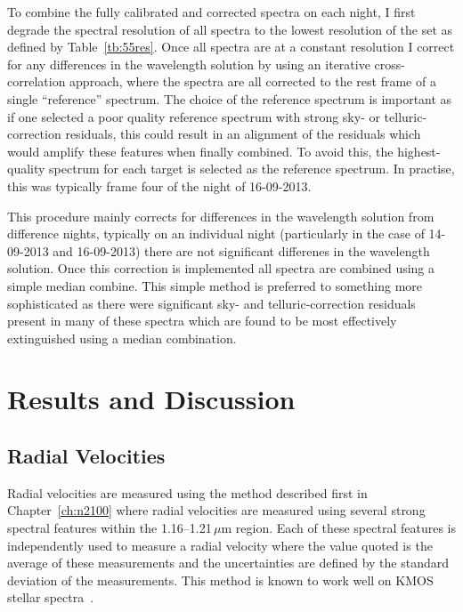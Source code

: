 To combine the fully calibrated and corrected spectra on each night, I first degrade the spectral resolution of all spectra to the lowest resolution of the set as defined by Table~\ref{tb:55res}.
Once all spectra are at a constant resolution I correct for any differences in the wavelength solution by using an iterative cross-correlation approach, where the spectra are all corrected to the rest frame of a single ``reference'' spectrum.
The choice of the reference spectrum is important as if one selected a poor quality reference spectrum with strong sky- or telluric-correction residuals, this could result in an alignment of the residuals which would amplify these features when finally combined.
To avoid this, the highest-quality spectrum for each target is selected as the reference spectrum.
In practise, this was typically frame four of the night of 16-09-2013.

This procedure mainly corrects for differences in the wavelength solution from difference nights, typically on an individual night (particularly in the case of 14-09-2013 and 16-09-2013) there are not significant differenes in the wavelength solution.
Once this correction is implemented all spectra are combined using a simple median combine.
This simple method is preferred to something more sophisticated as there were significant sky- and telluric-correction residuals present in many of these spectra which are found to be most effectively extinguished using a median combination.



\section{Results and Discussion} %
\label{sec:ngc55results}

\subsection{Radial Velocities} %
\label{sub:rvs}
Radial velocities are measured using the method described first in Chapter~\ref{ch:n2100} where radial velocities are measured using several strong spectral features within the 1.16--1.21\,$\mu$m region.
Each of these spectral features is independently used to measure a radial velocity where the value quoted is the average of these measurements and the uncertainties are defined by the standard deviation of the measurements.
This method is known to work well on KMOS stellar spectra~\cite{2015ApJ...798...23L,2015ApJ...803...14P,2016arXiv160202702P}.

